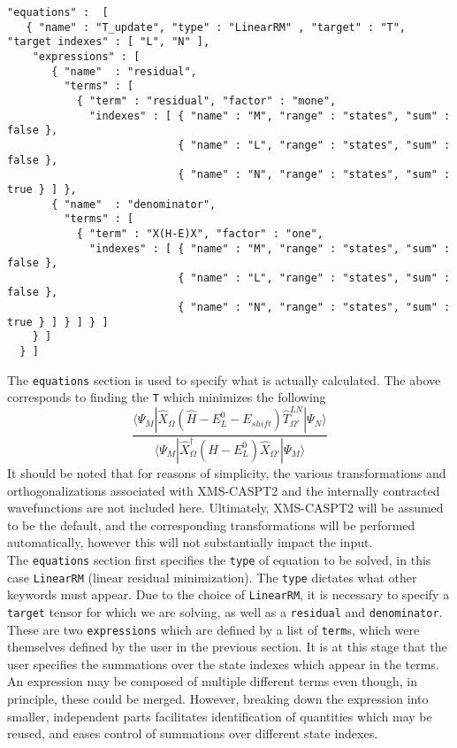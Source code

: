 \begin{lstlisting}[label={lst:equations}]
"equations" :  [
   { "name" : "T_update", "type" : "LinearRM" , "target" : "T", "target indexes" : [ "L", "N" ],
    "expressions" : [
       { "name"  : "residual",
         "terms" : [
           { "term" : "residual", "factor" : "mone",
             "indexes" : [ { "name" : "M", "range" : "states", "sum" : false },
                           { "name" : "L", "range" : "states", "sum" : false },
                           { "name" : "N", "range" : "states", "sum" : true } ] },
       { "name"  : "denominator",
         "terms" : [
           { "term" : "X(H-E)X", "factor" : "one",                                                 
             "indexes" : [ { "name" : "M", "range" : "states", "sum" : false },
                           { "name" : "L", "range" : "states", "sum" : false },
                           { "name" : "N", "range" : "states", "sum" : true } ] } ] } ]
    } ]
  } ]
\end{lstlisting}         
The \texttt{equations} section is used to specify what is actually calculated. The above corresponds to
finding the \texttt{T} which minimizes the following
\begin{equation}
\frac{ \langle \Psi_{M} |  \hat{X}_{\Omega} ( \hat{H}-E^{0}_{L}-E_{shift} )  \hat{T}^{LN}_{\Omega'} | \Psi_{N} \rangle } 
{ \langle \Psi_{M}   | \hat{X}^{\dagger}_{\Omega}
                     ( \hat{H}- E^{0}_{L} )
                       \hat{X}_{\Omega'} | \Psi_{M} \rangle}
\end{equation}
It should be noted that for reasons of simplicity, the various transformations and orthogonalizations associated
with XMS-CASPT2 and the internally contracted wavefunctions are not included here. Ultimately, XMS-CASPT2
will be assumed to be the default, and the corresponding transformations will be performed automatically, however
this will not substantially impact the input. \\

\noindent The  \texttt{equations} section first specifies the \texttt{type} of equation to be solved, in
this case \texttt{LinearRM} (linear residual minimization). The \texttt{type} dictates what other keywords must appear.
Due to the choice of \texttt{LinearRM}, it is necessary to specify a \texttt{target} tensor for 
which we are solving, as well as a \texttt{residual} and \texttt{denominator}. These are two \texttt{expressions}
which are defined by a list of \texttt{term}s, which were themselves defined by the user in the previous section. 
It is at this stage that the user specifies the summations over the state indexes which appear in the terms.\\

\noindent An expression may be composed of multiple different terms even though, in principle, these could be merged.
However, breaking down the expression into smaller, independent parts facilitates identification of
quantities which may be reused, and eases control of summations over different state indexes. 
